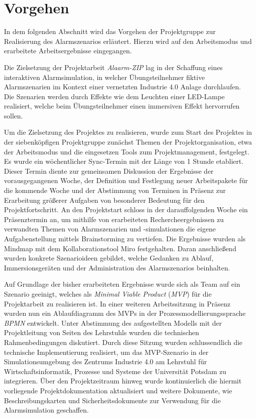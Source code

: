 \section{Vorgehen}

In dem folgenden Abschnitt wird das Vorgehen der Projektgruppe zur Realisierung des Alarmszenarios erläutert. Hierzu wird auf den Arbeitsmodus  und erarbeitete Arbeitsergebnisse eingegangen.

Die Zielsetzung der Projektarbeit \textit{Alaarm-ZIP} lag in der Schaffung eines interaktiven Alarmsimulation, in welcher Übungsteilnehmer fiktive Alarmszenarien im Kontext einer vernetzten Industrie 4.0 Anlage durchlaufen. Die Szenarien werden durch Effekte wie dem Leuchten einer LED-Lampe realisiert, welche beim Übungsteilnehmer einen immersiven Effekt hervorrufen sollen. 

Um die Zielsetzung des Projektes zu realisieren, wurde zum Start des Projektes in der siebenköpfigen Projektgruppe zunächst Themen der Projektorganisation, etwa der Arbeitsmodus und die eingesetzen Tools zum Projektmanagement, festgelegt. Es wurde ein wöchentlicher Sync-Termin mit der Länge von 1 Stunde etabliert. Dieser Termin diente zur gemeinsamen Diskussion der Ergebnisse der vorausgegangenen Woche, der Definition und Festlegung neuer Arbeitspakete für die kommende Woche und der Abstimmung von Terminen in Präsenz zur Erarbeitung größerer Aufgaben von besonderer Bedeutung für den Projektfortschritt. An den Projektstart schloss in der darauffolgenden Woche ein Präsenztermin an, um mithilfe von erarbeiteten Rechercheergebnissen zu verwandten Themen von Alarmszenarien und -simulationen die eigene Aufgabenstellung mittels Brainstorming zu vertiefen. Die Ergebnisse wurden als Mindmap mit dem Kollaborationstool Miro festgehalten. Daran anschließend wurden konkrete Szenarioideen gebildet, welche Gedanken zu Ablauf, Immersionsgeräten und der Administration des Alarmszenarios beinhalten. 

Auf Grundlage der bisher erarbeiteten Ergebnisse wurde sich als Team auf ein Szenario geeinigt, welches als \textit{Minimal Viable Product} (\textit{MVP}) für die Projektarbeit zu realisieren ist. In einer weiteren Arbeitssitzung in Präsenz wurden nun ein Ablaufdiagramm des MVPs in der Prozessmodellierungssprache \textit{BPMN} entwickelt. Unter Abstimmung des aufgestellten Modells mit der Projektleitung von Seiten des Lehrstuhls wurden die technischen Rahmenbedingungen diskutiert. Durch diese Sitzung wurden schlussendlich die technische Implementierung realisiert, um das MVP-Szenario in der Simulationsumgebung des Zentrums Industrie 4.0 am Lehrstuhl für Wirtschaftsinformatik, Prozesse und Systeme der Universität Potsdam zu integrieren. Über den Projektzeitraum hinweg wurde kontinuierlich die hiermit vorliegende Projektdokumentation aktualisiert und weitere Dokumente, wie Beschreibungskarten und Sicherheitsdokumente zur Verwendung für die Alarmsimulation geschaffen.   



